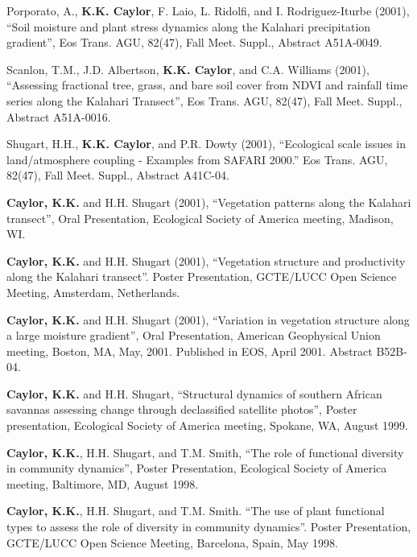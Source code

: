 \documentclass[10pt]{report}
\begin{document}
\begin{etaremune}
\item Porporato, A., \textbf{K.K. Caylor}, F. Laio, L. Ridolfi, and I. Rodriguez-Iturbe (2001), ``Soil moisture and plant stress dynamics along the Kalahari precipitation gradient'', Eos Trans. AGU, 82(47), Fall Meet. Suppl., Abstract A51A-0049.

\item Scanlon, T.M., J.D. Albertson, \textbf{K.K. Caylor}, and C.A. Williams (2001), ``Assessing fractional tree, grass, and bare soil cover from NDVI and rainfall time series along the Kalahari Transect'', Eos Trans. AGU, 82(47), Fall Meet. Suppl., Abstract A51A-0016.

\item Shugart, H.H., \textbf{K.K. Caylor}, and P.R. Dowty (2001), ``Ecological scale issues in land/atmosphere coupling - Examples from SAFARI 2000.'' Eos Trans. AGU, 82(47), Fall Meet. Suppl., Abstract A41C-04.

\item \textbf{Caylor, K.K.} and H.H. Shugart (2001), ``Vegetation patterns along the Kalahari transect'', Oral Presentation, Ecological Society of America meeting, Madison, WI.

\item \textbf{Caylor, K.K.} and H.H. Shugart (2001), ``Vegetation structure and productivity along the Kalahari transect''. Poster Presentation, GCTE/LUCC Open Science Meeting, Amsterdam, Netherlands.

\item \textbf{Caylor, K.K.} and H.H. Shugart (2001), ``Variation in vegetation structure along a large moisture gradient'', Oral Presentation, American Geophysical Union meeting, Boston, MA, May, 2001. Published in EOS, April 2001. Abstract B52B-04.

\item \textbf{Caylor, K.K.} and H.H. Shugart, ``Structural dynamics of southern African savannas assessing change through declassified satellite photos'', Poster presentation, Ecological Society of America meeting, Spokane, WA, August 1999.

\item \textbf{Caylor, K.K.}, H.H. Shugart, and T.M. Smith, ``The role of functional diversity in community dynamics'', Poster Presentation, Ecological Society of America meeting, Baltimore, MD, August 1998.

\item \textbf{Caylor, K.K.}, H.H. Shugart, and T.M. Smith. ``The use of plant functional types to assess the role of diversity in community dynamics''. Poster Presentation, GCTE/LUCC Open Science Meeting, Barcelona, Spain, May 1998.

\end{etaremune}
\end{document}
